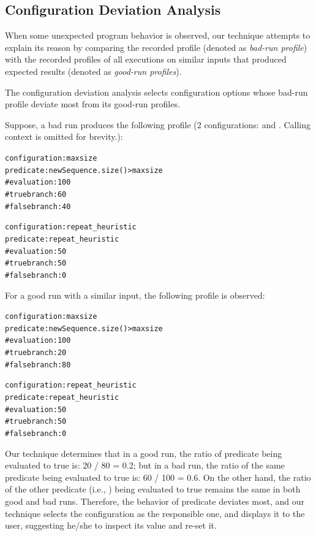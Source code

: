 \subsection{Configuration Deviation Analysis}
\label{sec:analysis}

When some unexpected program behavior is observed, our technique
attempts to explain its reason by comparing the recorded profile (denoted
as \textit{bad-run profile}) with the recorded profiles of all
executions on similar inputs that produced expected results (denoted as \textit{good-run profiles}).

The configuration deviation analysis selects configuration
options whose bad-run profile deviate most from its good-run profiles.

Suppose, a bad run produces the following profile (2 configurations: 
and . Calling context is omitted for brevity.):

\begin{CodeOut}
\begin{alltt}
configuration: maxsize 
predicate: newSequence.size() > maxsize
    \# evaluation: 100
    \# true branch: 60
    \# false branch: 40

configuration: repeat_heuristic
predicate: repeat_heuristic
    \# evaluation: 50
    \# true branch: 50
    \# false branch: 0
\end{alltt}
\end{CodeOut}

For a good run with a similar input, the following profile is observed:

\begin{CodeOut}
\begin{alltt}
configuration: maxsize 
predicate: newSequence.size() > maxsize
    \# evaluation: 100
    \# true branch: 20
    \# false branch: 80

configuration: repeat_heuristic
predicate: repeat_heuristic
    \# evaluation: 50
    \# true branch: 50
    \# false branch: 0
\end{alltt}
\end{CodeOut}

Our technique determines that in a good run, the ratio of predicate 
 being evaluated to true is: 20 / 80 = 0.2;
but in a bad run, the ratio of the same predicate being evaluated to true is: 60 / 100 = 0.6.
On the other hand, the ratio of the other predicate (i.e., ) being evaluated to true
remains the same in both good and bad runs. Therefore, the behavior
of predicate  deviates most, and our technique
selects the  configuration as the responsible one, and displays it to the user, suggesting he/she
to inspect its value and re-set it.

